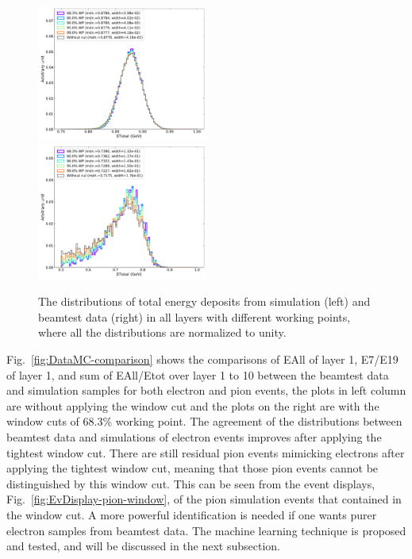 \begin{figure}[!ht]
    \begin{center}  
    \includegraphics[width=0.5\textwidth]{Fig/fig_HGCAL/Etotal-WP-100GeV}~
    \includegraphics[width=0.5\textwidth]{Fig/fig_HGCAL/Etotal-WP-Junev11data-100GeV}\\
    \caption{The distributions of total energy deposits from simulation (left) and beamtest data (right) in all layers with different working points, where all the distributions are normalized to unity.}
    \label{fig:Etotal-WP-100GeV}
    \end{center}
\end{figure}

Fig.~\ref{fig:DataMC-comparison} shows the comparisons of EAll of layer 1, E7/E19 of layer 1, and sum of EAll/Etot over layer 1 to 10 between the beamtest data and simulation samples for both electron and pion events, the plots in left column are without applying the window cut and the plots on the right are with the window cuts of 68.3\% working point. The agreement of the distributions between beamtest data and simulations of electron events improves after applying the tightest window cut. There are still residual pion events mimicking electrons after applying the tightest window cut, meaning that those pion events cannot be distinguished by this window cut. This can be seen from the event displays, Fig.~\ref{fig:EvDisplay-pion-window}, of the pion simulation events that contained in the window cut. A more powerful identification is needed if one wants purer electron samples from beamtest data. The machine learning technique is proposed and tested, and will be discussed in the next subsection.

